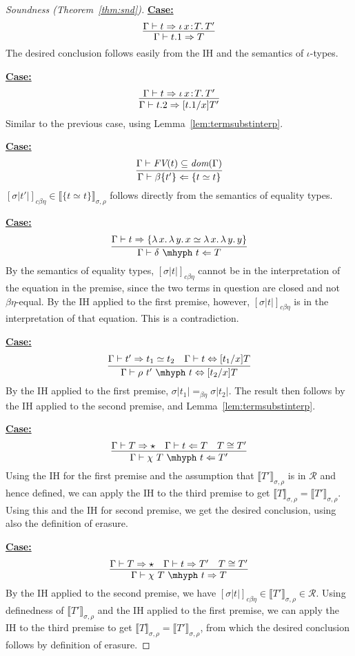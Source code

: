 \documentclass{article}
\newcommand{\abs}[4]{{#1}\, #2\! : \! #3.\, #4}
\newcommand{\absu}[3]{{#1}\, #2.\, #3}
\newcommand{\interp}[1]{\llbracket #1 \rrbracket}
\newcommand{\tpcheck}[0]{\Leftarrow}
\newcommand{\tpsynth}[0]{\Rightarrow}
\newcommand{\cbe}[0]{c\beta\eta}
\newcommand{\startcase}[1]{\vspace{#1} \noindent\textbf{\underline{Case:}}}
\begin{document}
\begin{proof}[Soundness (Theorem~\ref{thm:snd})]
\startcase{.2cm}
\[
   \infer{\Gamma\vdash t.1 \tpsynth T}{\Gamma\vdash t \tpsynth \abs{\iota}{x}{T}{T'}} 
\]
The desired conclusion follows easily from the IH and the semantics of $\iota$-types.

\startcase{.2cm}
\[
    \infer{\Gamma\vdash t.2 \tpsynth [t.1/x]T'}{\Gamma\vdash t \tpsynth \abs{\iota}{x}{T}{T'}} 
\]
Similar to the previous case, using Lemma~\ref{lem:termsubstinterp}.

\startcase{.2cm}
\[
    \infer{\Gamma\vdash \beta\{t'\} \tpcheck \{ t \simeq t \}}{\Gamma\vdash \textit{FV}(t)\subseteq \textit{dom}(\Gamma)}  
\]
$[\sigma|t'|]_{\cbe}\in\interp{\{ t \simeq t \}}_{\sigma,\rho}$ follows directly from the semantics of equality types.

\startcase{.2cm}
\[
    \infer{\Gamma\vdash \delta\ \mhyph\ t \tpcheck T}{\Gamma\vdash t\tpsynth \{ \absu{\lambda}{x}{\absu{\lambda}{y}{x}} \simeq \absu{\lambda}{x}{\absu{\lambda}{y}{y}}\}}  
\]
By the semantics of equality types, $[\sigma|t|]_{\cbe}$ cannot be in the interpretation of the equation in the premise,
since the two terms in question are closed and not $\beta\eta$-equal.  By the IH applied to the first premise, however,
$[\sigma|t|]_{\cbe}$ is in the interpretation of that equation.  This is a contradiction.

\startcase{.2cm}
\[
    \infer{\Gamma\vdash \rho\ t'\ \mhyph\ t \Leftrightarrow [t_2/x]T}
          {\Gamma\vdash t' \tpsynth t_1 \simeq t_2 & \Gamma \vdash t \Leftrightarrow [t_1/x]T} 
\]
By the IH applied to the first premise, $\sigma|t_1| =_{\beta\eta} \sigma|t_2|$.  The result then follows by the IH applied to the second premise,
and Lemma~\ref{lem:termsubstinterp}.

\startcase{.2cm}
\[
    \infer{\Gamma\vdash \chi\ T\ \mhyph\ t \tpcheck T'}
          {\Gamma\vdash T\tpsynth \star & \Gamma\vdash t \tpcheck T & T \cong T'} 
\]
Using the IH for the first premise and the assumption that $\interp{T'}_{\sigma,\rho}$ is in $\mathcal{R}$ and hence defined,
we can apply the IH to the third premise to get $\interp{T}_{\sigma,\rho} = \interp{T'}_{\sigma,\rho}$.  Using this and the IH for second premise,
we get the desired conclusion, using also the definition of erasure.

\startcase{.2cm}
\[
    \infer{\Gamma\vdash \chi\ T\ \mhyph\ t \tpsynth T}
          {\Gamma\vdash T\tpsynth \star & \Gamma\vdash t \tpsynth T' & T \cong T'} 
\]
By the IH applied to the second premise, we have $[\sigma|t|]_{\cbe}\in\interp{T'}_{\sigma,\rho}\in\mathcal{R}$.
Using definedness of $\interp{T'}_{\sigma,\rho}$ and the IH applied to the first premise, we can apply the
IH to the third premise to get $\interp{T}_{\sigma,\rho} = \interp{T'}_{\sigma,\rho}$, from which the desired
conclusion follows by definition of erasure.


\end{proof}
\end{document}
